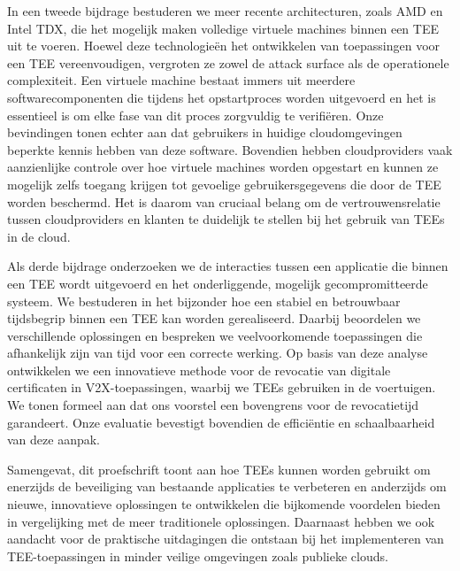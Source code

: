 In een tweede bijdrage bestuderen we meer recente architecturen, zoals AMD
\sevsnp{} en Intel \ac{TDX}, die het mogelijk maken volledige virtuele machines
binnen een \ac{TEE} uit te voeren. Hoewel deze technologieën het ontwikkelen van
toepassingen voor een \ac{TEE} vereenvoudigen, vergroten ze zowel de attack
surface als de operationele complexiteit. Een virtuele machine bestaat immers
uit meerdere softwarecomponenten die tijdens het opstartproces worden uitgevoerd
en het is essentieel is om elke fase van dit proces zorgvuldig te verifiëren.
Onze bevindingen tonen echter aan dat gebruikers in huidige cloudomgevingen
beperkte kennis hebben van deze software. Bovendien hebben cloudproviders vaak
aanzienlijke controle over hoe virtuele machines worden opgestart en kunnen ze
mogelijk zelfs toegang krijgen tot gevoelige gebruikersgegevens die door de
\ac{TEE} worden beschermd. Het is daarom van cruciaal belang om de
vertrouwensrelatie tussen cloudproviders en klanten te duidelijk te stellen bij
het gebruik van \acp{TEE} in de cloud.

Als derde bijdrage onderzoeken we de interacties tussen een applicatie die
binnen een \ac{TEE} wordt uitgevoerd en het onderliggende, mogelijk
gecompromitteerde systeem. We bestuderen in het bijzonder hoe een stabiel en
betrouwbaar tijdsbegrip binnen een \ac{TEE} kan worden gerealiseerd. Daarbij
beoordelen we verschillende oplossingen en bespreken we veelvoorkomende
toepassingen die afhankelijk zijn van tijd voor een correcte werking. Op basis
van deze analyse ontwikkelen we een innovatieve methode voor de revocatie van
digitale certificaten in \ac{V2X}-toepassingen, waarbij we \acp{TEE} gebruiken
in de voertuigen. We tonen formeel aan dat ons voorstel een bovengrens voor de
revocatietijd garandeert. Onze evaluatie bevestigt bovendien de efficiëntie en
schaalbaarheid van deze aanpak.

Samengevat, dit proefschrift toont aan hoe \acp{TEE} kunnen worden gebruikt om
enerzijds de beveiliging van bestaande applicaties te verbeteren en anderzijds
om nieuwe, innovatieve oplossingen te ontwikkelen die bijkomende voordelen
bieden in vergelijking met de meer traditionele oplossingen. Daarnaast hebben we
ook aandacht voor de praktische uitdagingen die ontstaan bij het implementeren
van \ac{TEE}-toepassingen in minder veilige omgevingen zoals publieke clouds.
